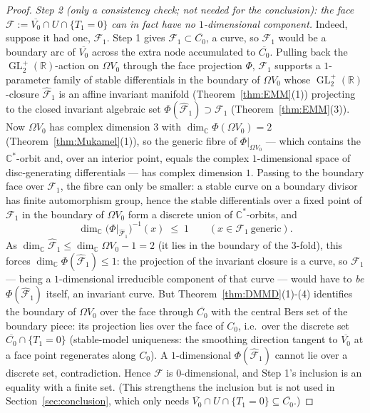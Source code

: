 \documentclass[11pt]{article}
\newcommand{\C}{\mathbb{C}}
\newcommand{\R}{\mathbb{R}}
\DeclareMathOperator{\GL}{GL}
\theoremstyle{definition}
\theoremstyle{remark}
\begin{document}
\begin{proof}
\emph{Step 2 (only a consistency check; not needed for the
conclusion): the face $\mathcal F := \overline{V_0}\cap U\cap
\{T_1 = 0\}$ can in fact have no $1$-dimensional component.}
Indeed, suppose it had one, $\mathcal F_1$. Step 1 gives
$\mathcal F_1 \subset \overline{C_0}$, a curve, so $\mathcal F_1$
would be a boundary arc of $\overline{V_0}$ across the extra node
accumulated to $\overline{C_0}$. Pulling back the
$\GL_2^+(\R)$-action on $\Omega V_0$ through the face projection
$\Phi$, $\mathcal F_1$ supports a $1$-parameter family of stable
differentials in the boundary of $\Omega V_0$ whose
$\GL_2^+(\R)$-closure $\widehat{\mathcal F}_1$ is an affine
invariant manifold (Theorem~\ref{thm:EMM}(1)) projecting to the
closed invariant algebraic set
$\Phi(\widehat{\mathcal F}_1) \supset \mathcal F_1$
(Theorem~\ref{thm:EMM}(3)). Now $\Omega V_0$ has complex
dimension $3$ with $\dim_{\C}\Phi(\Omega V_0) = 2$
(Theorem~\ref{thm:Mukamel}(1)), so the generic fibre of
$\Phi|_{\Omega V_0}$ --- which contains the $\C^*$-orbit and, over
an interior point, equals the complex $1$-dimensional space of
disc-generating differentials --- has complex dimension $1$. Passing
to the boundary face over $\mathcal F_1$, the fibre can only be
smaller: a stable curve on a boundary divisor has finite
automorphism group, hence the stable differentials over a fixed
point of $\mathcal F_1$ in the boundary of $\Omega V_0$ form a
discrete union of $\C^*$-orbits, and
\[
\dim_{\C}\bigl(\Phi|_{\widehat{\mathcal F}_1}\bigr)^{-1}(x)
\;\le\; 1 \qquad (x \in \mathcal F_1 \ \text{generic}) .
\]
As
$\dim_{\C}\widehat{\mathcal F}_1 \le \dim_{\C}\Omega V_0 - 1 = 2$
(it lies in the boundary of the $3$-fold), this forces
$\dim_{\C}\Phi(\widehat{\mathcal F}_1) \le 1$: the projection of the
invariant closure is a curve, so $\mathcal F_1$ --- being a
$1$-dimensional irreducible component of that curve --- would have
to \emph{be} $\Phi(\widehat{\mathcal F}_1)$ itself, an invariant
curve. But Theorem~\ref{thm:DMMD}(1)-(4) identifies the boundary of
$\Omega V_0$ over the face through $\overline{C_0}$ with the central
Bers set of the boundary piece: its projection lies over the face of
$C_0$, i.e.\ over the discrete set $\overline{C_0}\cap\{T_1 = 0\}$
(stable-model uniqueness: the smoothing direction tangent to
$\overline{V_0}$ at a face point regenerates along $C_0$). A
$1$-dimensional $\Phi(\widehat{\mathcal F}_1)$ cannot lie over a
discrete set, contradiction. Hence $\mathcal F$ is
$0$-dimensional, and Step 1's inclusion is an equality with a
finite set. (This strengthens the inclusion but is not used in
Section~\ref{sec:conclusion}, which only needs
$\overline{V_0}\cap U\cap\{T_1=0\} \subseteq \overline{C_0}$.)
\end{proof}
\end{document}
